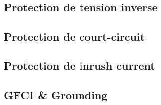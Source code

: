 \subsection{Protection de tension inverse}
\subsection{Protection de court-circuit}
\subsection{Protection de inrush current}
\subsection{GFCI \& Grounding}